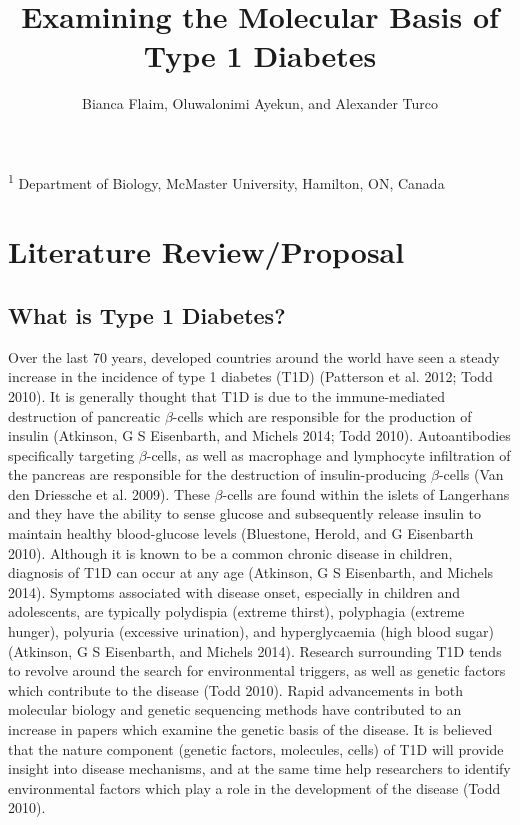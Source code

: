 \documentclass{article}
\title{\sc Examining the Molecular Basis of Type 1 Diabetes}
\author{\sc Bianca Flaim, Oluwalonimi Ayekun, and Alexander Turco}
\begin{document}

\onecolumn
                        \maketitle

\thispagestyle{empty}
\noindent \textsuperscript{1} Department of Biology, McMaster University, Hamilton, ON, Canada

\newpage
\tableofcontents
\newpage
       

\section{Literature Review/Proposal}

\subsection{What is Type 1 Diabetes?}
Over the last 70 years, developed countries around the world have seen a steady increase in the incidence of type 1
diabetes (T1D) (Patterson et al. 2012; Todd 2010). It is generally thought that T1D is due to the immune-mediated destruction of
pancreatic $\beta$-cells which are responsible for the production of insulin (Atkinson, G S Eisenbarth, and Michels 2014; Todd 2010).
Autoantibodies specifically targeting $\beta$-cells, as well as macrophage and lymphocyte infiltration of the pancreas are responsible
for the destruction of insulin-producing $\beta$-cells (Van den Driessche et al. 2009). These $\beta$-cells are found within the islets of Langerhans and they have the ability to sense glucose and subsequently release insulin to maintain healthy blood-glucose levels (Bluestone, Herold, and G Eisenbarth 2010). Although it is known to be a common chronic disease in children, diagnosis of
T1D can occur at any age (Atkinson, G S Eisenbarth, and Michels 2014). Symptoms associated with disease onset, especially in
children and adolescents, are typically polydispia (extreme thirst), polyphagia (extreme hunger), polyuria (excessive urination),
and hyperglycaemia (high blood sugar) (Atkinson, G S Eisenbarth, and Michels 2014). Research surrounding T1D tends to
revolve around the search for environmental triggers, as well as genetic factors which contribute to the disease (Todd 2010).
Rapid advancements in both molecular biology and genetic sequencing methods have contributed to an increase in papers which
examine the genetic basis of the disease. It is believed that the nature component (genetic factors, molecules, cells) of T1D will
provide insight into disease mechanisms, and at the same time help researchers to identify environmental factors which play a
role in the development of the disease (Todd 2010).
\end{document}
